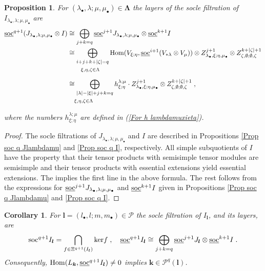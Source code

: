 \documentclass[12pt]{article}
\def\mc {\mathcal}
\def\ul  {\underline}
\newtheorem{prop}[theorem]{Proposition}
\newtheorem{coro}[theorem]{Corollary}
\begin{document}
\begin{prop}\label{Prop soc q Ilambdamu}
For $(\lambda_\bullet,\lambda;\mu,\mu_\bullet)\in \bm\Lambda$ the layers of the socle filtration of $I_{\lambda_\bullet,\lambda;\mu,\mu_\bullet}$ are
\begin{align*}
\ul{\rm soc}^{q+1}(J_{\lambda_\bullet,\lambda;\mu,\mu_\bullet}\otimes I) & \cong \bigoplus\limits_{j+k=q} \ul{\rm soc}^{j+1}J_{\lambda_\bullet,\lambda;\mu,\mu_\bullet} \otimes \ul{\rm soc}^{k+1}I \\
& \cong \bigoplus\limits_{i+j+k+|\zeta|=q} {\rm Hom}(V_{\xi;\eta},\ul{\rm soc}^{i+1}(V_{*\lambda}\otimes V_{\mu}))\otimes Z^{j+1}_{\lambda_{\bullet},\xi;\eta,\mu_{\bullet}} \otimes Z^{k+|\zeta|+1}_{\zeta,\emptyset;\emptyset,\zeta} \\
&\qquad{^{\xi,\eta,\zeta\in\Lambda}} \qquad\qquad\qquad\qquad\qquad \\
& \cong \bigoplus\limits_{|\lambda|-|\xi|+j+k=q} h^{\lambda;\mu}_{\xi;\eta} \cdot Z^{j+1}_{\lambda_{\bullet},\xi;\eta,\mu_{\bullet}} \otimes Z^{k+|\zeta|+1}_{\zeta,\emptyset;\emptyset,\zeta} \;,\\
& \quad {^{\xi,\eta,\zeta\in\Lambda}}
\end{align*}
where the numbers $h^{\lambda;\mu}_{\xi;\eta}$ are defined in (\ref{For h lambdamuxieta}).
\end{prop}

\begin{proof}
The socle filtrations of $J_{\lambda_\bullet,\lambda;\mu,\mu_\bullet}$ and $I$ are described in Propositions \ref{Prop soc q Jlambdamu} and \ref{Prop soc q I}, respectively. All simple subquotients of $I$ have the property that their tensor products with semisimple tensor modules are semisimple and their tensor products with essential extensions yield essential extensions. The implies the first line in the above formula. The rest follows from the expressions for $\ul{\rm soc}^{j+1}J_{\lambda_\bullet,\lambda;\mu,\mu_\bullet}$ and $\ul{\rm soc}^{k+1}I$ given in Propositions \ref{Prop soc q Jlambdamu} and \ref{Prop soc q I}.
\end{proof}


\begin{coro}\label{Coro soc filt Ilm}
For $\bm l=(l_\bullet,l;m,m_\bullet)\in \mc P$ the socle filtration of $I_{\bm l}$, and its layers, are
\begin{gather*}
{\rm soc}^{q+1}I_{\bm l} =\bigcap\limits_{f\in\Xi^{q+1}(I_{\bm l})} {\rm ker}f \;,\quad \ul{\rm soc}^{q+1}I_{\bm l} \cong \bigoplus\limits_{j+k=q} \ul{\rm soc}^{j+1}J_{\bm l} \otimes \ul{\rm soc}^{k+1}I \;.
\end{gather*}
Consequently, ${\rm Hom}(L_{\bm k},\ul{\rm soc}^{q+1}I_{\bm l})\ne 0$ implies $\bm k\in\mc P^{q}(\bm l)$.
\end{coro}
\end{document}
